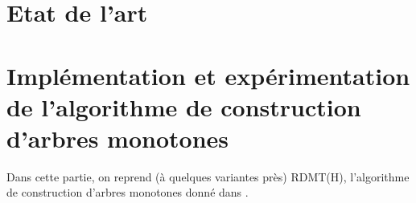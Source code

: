 \documentclass[a4paper]{article}
\begin{document}
\section{Etat de l'art}

\section{Implémentation et expérimentation de l'algorithme de construction d'arbres monotones}
Dans cette partie, on reprend (à quelques variantes près) RDMT(H), l'algorithme de construction d'arbres monotones donné dans \cite{marsala-rank}. \\

\printbibliography
\end{document}
